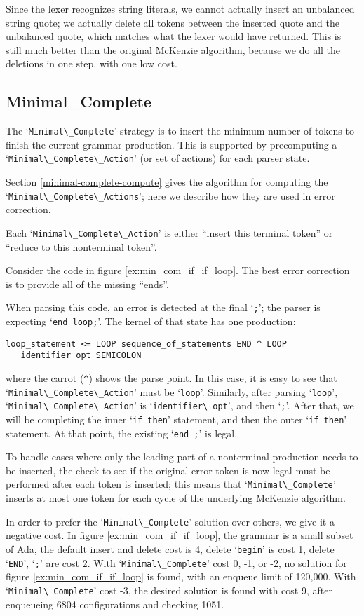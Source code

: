 \documentclass{article}
\newcommand{\code}[1]{`\lstinline|#1|'}
\begin{document}
Since the lexer recognizes string literals, we cannot actually insert
an unbalanced string quote; we actually delete all tokens between the
inserted quote and the unbalanced quote, which matches what the lexer
would have returned. This is still much better than the original
McKenzie algorithm, because we do all the deletions in one step, with
one low cost.

\subsection{Minimal\_Complete}
The \code{Minimal\_Complete} strategy is to insert the minimum number
of tokens to finish the current grammar production. This is supported
by precomputing a \code{Minimal\_Complete\_Action} (or set of actions)
for each parser state.

Section \ref{minimal-complete-compute} gives the algorithm for
computing the \code{Minimal\_Complete\_Actions}; here we describe how
they are used in error correction.

Each \code{Minimal\_Complete\_Action} is either ``insert this terminal
token'' or ``reduce to this nonterminal token''.

Consider the code in figure \ref{ex:min_com_if_if_loop}. The best error
correction is to provide all of the missing ``ends''.

When parsing this code, an error is detected at the final \code{;};
the parser is expecting \code{end loop;}. The kernel of that state has
one production:
\begin{verbatim}
loop_statement <= LOOP sequence_of_statements END ^ LOOP
   identifier_opt SEMICOLON
\end{verbatim}
where the carrot (\verb|^|) shows the parse point. In this case, it is
easy to see that \code{Minimal\_Complete\_Action} must be \code{loop}.
Similarly, after parsing \code{loop}, \code{Minimal\_Complete\_Action}
is \code{identifier\_opt}, and then \code{;}. After that, we will be
completing the inner \code{if then} statement, and then the outer
\code{if then} statement. At that point, the existing \code{end ;} is
legal.

To handle cases where only the leading part of a nonterminal
production needs to be inserted, the check to see if the original
error token is now legal must be performed after each token is
inserted; this means that \code{Minimal\_Complete} inserts at most one
token for each cycle of the underlying McKenzie algorithm.

In order to prefer the \code{Minimal\_Complete} solution over others,
we give it a negative cost. In figure \ref{ex:min_com_if_if_loop}, the
grammar is a small subset of Ada, the
default insert and delete cost is 4, delete \code{begin} is cost 1,
delete \code{END}, \code{;} are cost 2. With \code{Minimal\_Complete}
cost 0, -1, or -2, no solution for figure \ref{ex:min_com_if_if_loop}
is found, with an enqueue limit of 120,000. With
\code{Minimal\_Complete} cost -3, the desired solution is found with
cost 9, after enqueueing 6804 configurations and checking 1051.
\end{document}

